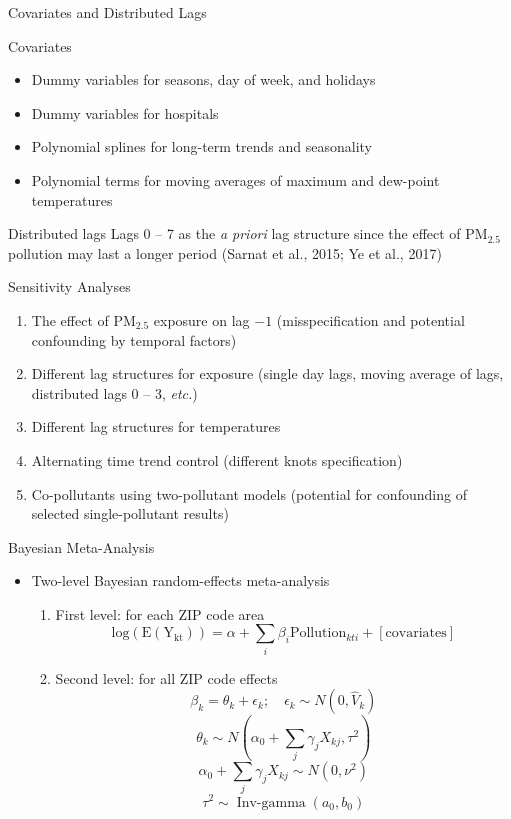 \documentclass[handout]{beamer} %
\begin{document}
\begin{frame}{Covariates and Distributed Lags}
    \begin{block}{Covariates}
        \begin{itemize}
            \item Dummy variables for seasons, day of week, and holidays
            \item Dummy variables for hospitals
            \item Polynomial splines for long-term trends and seasonality
            \item Polynomial terms for moving averages of maximum and dew-point temperatures
        \end{itemize}
    \end{block}
    \begin{block}{Distributed lags}
        Lags 0 -- 7 as the \textit{a priori} lag structure since the effect of PM$_{2.5}$ pollution may last a longer period (Sarnat et al., 2015; Ye et al., 2017)
    \end{block}
\end{frame}

\begin{frame}{Sensitivity Analyses}
    \begin{enumerate}
        \item The effect of PM$_{2.5}$ exposure on lag $-1$ \textcolor[rgb]{0.1,0.1,0.6}{(misspecification and potential confounding by temporal factors)}
        \item Different lag structures for exposure \textcolor[rgb]{0.1,0.1,0.6}{(single day lags, moving average of lags, distributed lags 0 -- 3, \textit{etc.})}
        \item Different lag structures for temperatures
        \item Alternating time trend control \textcolor[rgb]{0.1,0.1,0.6}{(different knots specification)}
        \item Co-pollutants using two-pollutant models \textcolor[rgb]{0.1,0.1,0.6}{(potential for confounding of selected single-pollutant results)}
    \end{enumerate}
\end{frame}


\begin{frame}{Bayesian Meta-Analysis}
    \begin{itemize}
       \item Two-level Bayesian random-effects meta-analysis
        \begin{enumerate}
            \item First level: for each ZIP code area$$ \mathrm{log(E(Y_{kt}))}=\alpha+\sum_i\beta_i\mathrm{Pollution}_{kti}+[\mathrm{covariates}]$$
            \item Second level: for all ZIP code effects
            $$\beta_k=\theta_k+\epsilon_k; \quad \epsilon_k\sim N(0, \hat{V}_k)$$
            $$\theta_k\sim N(\alpha_0+\sum_j\gamma_jX_{kj}, \tau^2)$$
            $$\alpha_0+\sum_j\gamma_jX_{kj} \sim N(0, \nu^2)$$
            $$\tau^2\sim \operatorname{Inv-gamma}(a_0, b_0)$$
        \end{enumerate}
    \end{itemize}
\end{frame}
\end{document}
